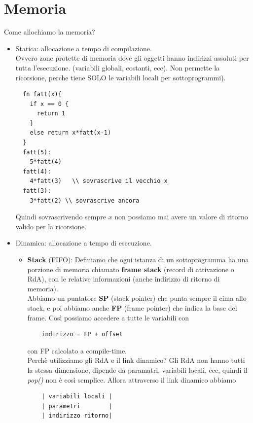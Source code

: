 \documentclass[a4paper,12pt]{article}
\begin{document}
\section{Memoria}
Come allochiamo la memoria?
\begin{itemize}
  \item Statica: allocazione a tempo di compilazione. \\
  Ovvero zone protette di memoria dove gli oggetti hanno indirizzi assoluti per tutta l'esecuzione. (variabili globali, costanti, ecc). Non permette la ricorsione, perche tiene  SOLO le variabili locali per sottoprogrammi).
  \begin{lstlisting}
  fn fatt(x){
    if x == 0 {
      return 1
    }
    else return x*fatt(x-1)
  }
  fatt(5):
    5*fatt(4)
  fatt(4):
    4*fatt(3)   \\ sovrascrive il vecchio x
  fatt(3):
    3*fatt(2) \\ sovrascrive ancora
  \end{lstlisting}
  Quindi sovrascrivendo sempre $x$ non possiamo mai avere un valore di ritorno valido per la ricorsione.
  \item Dinamica: allocazione a tempo di esecuzione. \\
  \begin{itemize}
    \item \textbf{Stack} (FIFO): Definiamo che ogni istanza di un sottoprogramma ha una porzione di memoria chiamato \textbf{frame stack} (record di attivazione o RdA), con le relative informazioni (anche indirizzo di ritorno di memoria). \\
      Abbiamo un puntatore \textbf{SP} (stack pointer) che punta sempre il cima allo stack, e poi abbiamo anche \textbf{FP} (frame pointer) che indica la base del frame. Così possiamo accedere a tutte le variabili con
      \begin{lstlisting}
    indirizzo = FP + offset
      \end{lstlisting}
      con FP calcolato a compile-time.\\
      \newline
      Perchè utilizziamo gli RdA e il link dinamico? Gli RdA non hanno tutti la stessa dimensione, dipende da paramatri, variabili locali, ecc, quindi il \textit{pop()} non è così semplice. Allora attraverso il link dinamico abbiamo
      \begin{center}
        \begin{lstlisting}
    | variabili locali |
    | parametri        |
    | indirizzo ritorno|

\end{lstlisting}
\end{center}
\end{itemize}
\end{itemize}
\end{document}
